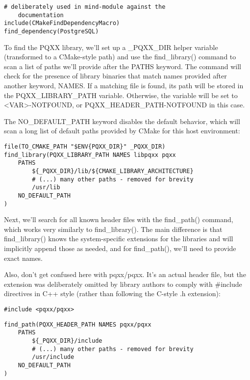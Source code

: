 \begin{lstlisting}[style=styleCMake]
# deliberately used in mind-module against the
	documentation
include(CMakeFindDependencyMacro)
find_dependency(PostgreSQL)
\end{lstlisting}

To find the PQXX library, we'll set up a \_PQXX\_DIR helper variable (transformed to a CMake-style path) and use the find\_library() command to scan a list of paths we'll provide after the PATHS keyword. The command will check for the presence of library binaries that match names provided after another keyword, NAMES. If a matching file is found, its path will be stored in the PQXX\_LIBRARY\_PATH variable. Otherwise, the variable will be set to <VAR>-NOTFOUND, or PQXX\_HEADER\_PATH-NOTFOUND in this case.

The NO\_DEFAULT\_PATH keyword disables the default behavior, which will scan a long list of default paths provided by CMake for this host environment:

\begin{lstlisting}[style=styleCMake]
file(TO_CMAKE_PATH "$ENV{PQXX_DIR}" _PQXX_DIR)
find_library(PQXX_LIBRARY_PATH NAMES libpqxx pqxx
	PATHS
		${_PQXX_DIR}/lib/${CMAKE_LIBRARY_ARCHITECTURE}
		# (...) many other paths - removed for brevity
		/usr/lib
	NO_DEFAULT_PATH
)
\end{lstlisting}

Next, we'll search for all known header files with the find\_path() command, which works very similarly to find\_library(). The main difference is that find\_library() knows the system-specific extensions for the libraries and will implicitly append those as needed, and for find\_path(), we'll need to provide exact names.

Also, don't get confused here with pqxx/pqxx. It's an actual header file, but the extension was deliberately omitted by library authors to comply with \#include directives in C++ style (rather than following the C-style .h extension):

\begin{lstlisting}[style=styleCXX]
#include <pqxx/pqxx>
\end{lstlisting}

\begin{lstlisting}[style=styleCMake]
find_path(PQXX_HEADER_PATH NAMES pqxx/pqxx
	PATHS
		${_PQXX_DIR}/include
		# (...) many other paths - removed for brevity
		/usr/include
	NO_DEFAULT_PATH
)
\end{lstlisting}

